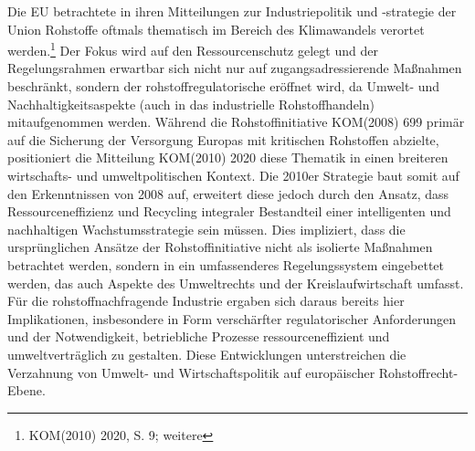 \documentclass[12pt,a4paper,oneside]{book} %
\begin{document}
Die EU betrachtete in ihren Mitteilungen zur Industriepolitik und -strategie der Union Rohstoffe oftmals thematisch im Bereich des Klimawandels verortet werden.\footnote{KOM(2010) 2020, S. 9; weitere} Der Fokus wird auf den Ressourcenschutz gelegt und der Regelungsrahmen erwartbar sich nicht nur auf zugangsadressierende Maßnahmen beschränkt, sondern der rohstoffregulatorische eröffnet wird, da Umwelt- und Nachhaltigkeitsaspekte (auch in das industrielle Rohstoffhandeln) mitaufgenommen werden. Während die Rohstoffinitiative KOM(2008) 699 primär auf die Sicherung der Versorgung Europas mit kritischen Rohstoffen abzielte, positioniert die Mitteilung KOM(2010) 2020 diese Thematik in einen breiteren wirtschafts- und umweltpolitischen Kontext. Die 2010er Strategie baut somit auf den Erkenntnissen von 2008 auf, erweitert diese jedoch durch den Ansatz, dass Ressourceneffizienz und Recycling integraler Bestandteil einer intelligenten und nachhaltigen Wachstumsstrategie sein müssen. Dies impliziert, dass die ursprünglichen Ansätze der Rohstoffinitiative nicht als isolierte Maßnahmen betrachtet werden, sondern in ein umfassenderes Regelungssystem eingebettet werden, das auch Aspekte des Umweltrechts und der Kreislaufwirtschaft umfasst. Für die rohstoffnachfragende Industrie ergaben sich daraus bereits hier Implikationen, insbesondere in Form verschärfter regulatorischer Anforderungen und der Notwendigkeit, betriebliche Prozesse ressourceneffizient und umweltverträglich zu gestalten. Diese Entwicklungen unterstreichen die Verzahnung von Umwelt- und Wirtschaftspolitik auf europäischer Rohstoffrecht-Ebene.
\end{document}
